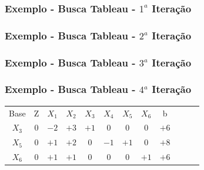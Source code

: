 \begin{frame}
	{
		\frametitle{Exemplo - Busca Tableau - \color{cyan} $1^a$ Iteração}
	}
	{
		\frametitle{Exemplo - Busca Tableau - \color{cyan} $2^a$ Iteração}
	}
	{
		\frametitle{Exemplo - Busca Tableau - \color{cyan} $3^a$ Iteração}
	}
	{
		\frametitle{Exemplo - Busca Tableau - \color{cyan} $4^a$ Iteração}
	}

	{
		\begin{table}		
			\begin{tabular}{c c c c c c c c c c c c}
				\cline{1-8} 
				\cellcolor{blue!100} \color{white} \scriptsize Base 
				&\cellcolor{blue!100} \color{white} \scriptsize Z 
				&\cellcolor{blue!100} \color{white} $\scriptstyle X_1$ 
				&\cellcolor{blue!100} \color{white} $\scriptstyle X_2$ 
				&\cellcolor{blue!100} \color{red}   $\scriptstyle X_3$ 
				&\cellcolor{blue!100} \color{white} $\scriptstyle X_4$ 
				&\cellcolor{blue!100} \color{red}   $\scriptstyle X_5$ 
				&\cellcolor{blue!100} \color{red}   $\scriptstyle X_6$ 
				&\cellcolor{blue!100} \color{white} \scriptsize b
				&
				&
				& \\
				\cellcolor{blue!100} \color{red} $\scriptstyle X_3$
				& \cellcolor{yellow!50} $\scriptstyle 0$
				& \cellcolor{yellow!50} $\scriptstyle -2$
				& \cellcolor{yellow!50} $\scriptstyle +3$
				& \cellcolor{yellow!50} $\scriptstyle +1$
				& \cellcolor{yellow!50} $\scriptstyle 0$
				& \cellcolor{yellow!50} $\scriptstyle 0$
				& \cellcolor{yellow!50} $\scriptstyle 0$
				& \cellcolor{yellow!50} $\scriptstyle +6$ \\
			    \cellcolor{blue!100} \color{red} $\scriptstyle X_5$
				& \cellcolor{yellow!50} $\scriptstyle 0$
				& \cellcolor{yellow!50} $\scriptstyle +1$
				& \cellcolor{yellow!50} $\scriptstyle +2$
				& \cellcolor{yellow!50} $\scriptstyle 0$			
				& \cellcolor{yellow!50} $\scriptstyle -1$
				& \cellcolor{yellow!50} $\scriptstyle +1$
				& \cellcolor{yellow!50} $\scriptstyle 0$ 
				& \cellcolor{yellow!50} $\scriptstyle +8$ \\
				\cellcolor{blue!100} \color{red} $\scriptstyle X_6$
				& \cellcolor{yellow!50} $\scriptstyle 0$
				& \cellcolor{yellow!50} $\scriptstyle +1$
				& \cellcolor{yellow!50} $\scriptstyle +1$
				& \cellcolor{yellow!50} $\scriptstyle 0$
				& \cellcolor{yellow!50} $\scriptstyle 0$
				& \cellcolor{yellow!50} $\scriptstyle 0$
				& \cellcolor{yellow!50} $\scriptstyle +1$
				& \cellcolor{yellow!50} $\scriptstyle +6$ \\

\end{tabular}
\end{table}}
\end{frame}
